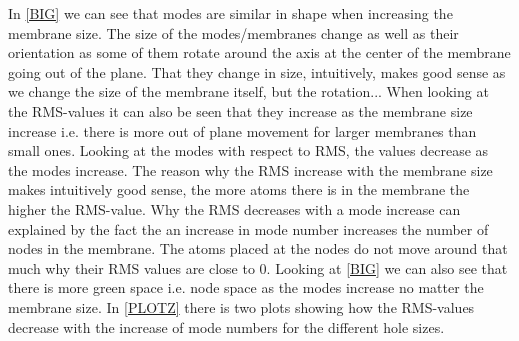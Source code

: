 In \cref{BIG} we can see that modes are similar in shape when increasing the membrane size. The size of the modes/membranes change as well as their orientation as some of them rotate around the axis at the center of the membrane going out of the plane. That they change in size, intuitively, makes good sense as we change the size of the membrane itself, but the rotation... When looking at the RMS-values it can also be seen that they increase as the membrane size increase i.e. there is more out of plane movement for larger membranes than small ones. Looking at the modes with respect to RMS, the values decrease as the modes increase. The reason why the RMS increase with the membrane size makes intuitively good sense, the more atoms there is in the membrane the higher the RMS-value. Why the RMS decreases with a mode increase can explained by the fact the an increase in mode number increases the number of nodes in the membrane. The atoms placed at the nodes do not move around that much why their RMS values are close to 0. Looking at \cref{BIG} we can also see that there is more green space i.e. node space as the modes increase no matter the membrane size. In \cref{PLOTZ} there is two plots showing how the RMS-values decrease with the increase of mode numbers for the different hole sizes.
